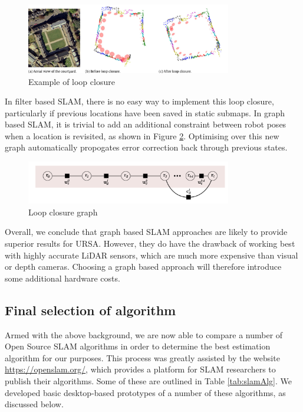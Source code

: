 \documentclass[capstone_report.tex]{subfiles}
\begin{document}
    \begin{figure}[H]
	     \centering
	     \includegraphics[width=0.8\textwidth]{imgs/loopClosure.png}
	     \caption{Example of loop closure\label{fig:loopClose}}
	 \end{figure} 

	 In filter based SLAM, there is no easy way to implement this loop closure, particularly if previous locations have been saved in static submaps. In graph based SLAM, it is trivial to add an additional constraint between robot poses when a location is revisited, as shown in Figure \ref{fig:loopClose2}. Optimising over this new graph automatically propogates error correction back through previous states.

	\begin{figure}[H]
	    \centering
	    \includegraphics[width=0.8\textwidth]{imgs/loopClosureGraph.png}
	    \caption{Loop closure graph\label{fig:loopClose2}}
	\end{figure}

	Overall, we conclude that graph based SLAM approaches are likely to provide superior results for URSA. However, they do have the drawback of working best with highly accurate LiDAR sensors, which are much more expensive than visual or depth cameras. Choosing a graph based approach will therefore introduce some additional hardware costs.

	\subsection{Final selection of algorithm}
	Armed with the above background, we are now able to compare a number of Open Source SLAM algorithms in order to determine the best estimation algorithm for our purposes. This process was greatly assisted by the website \url{https://openslam.org/}, which provides a platform for SLAM researchers to publish their algorithms. Some of these are outlined in Table \ref{tab:slamAlg}. We developed basic desktop-based prototypes of a number of these algorithms, as discussed below.
\end{document}
